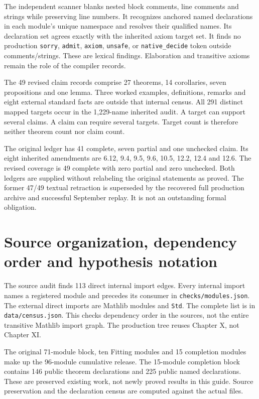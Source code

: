 \documentclass[11pt]{article}
\newcommand{\code}[1]{\nolinkurl{#1}}
\begin{document}
The independent scanner blanks nested block comments, line comments and strings while preserving line numbers. It recognizes anchored named declarations in each module's unique namespace and resolves their qualified names. Its declaration set agrees exactly with the inherited axiom target set. It finds no production \code{sorry}, \code{admit}, \code{axiom}, \code{unsafe}, or \code{native_decide} token outside comments/strings. These are lexical findings. Elaboration and transitive axioms remain the role of the compiler records.

The 49 revised claim records comprise 27 theorems, 14 corollaries, seven propositions and one lemma. Three worked examples, definitions, remarks and eight external standard facts are outside that internal census. All 291 distinct mapped targets occur in the 1,229-name inherited audit. A target can support several claims. A claim can require several targets. Target count is therefore neither theorem count nor claim count.

The original ledger has 41 complete, seven partial and one unchecked claim. Its eight inherited amendments are 6.12, 9.4, 9.5, 9.6, 10.5, 12.2, 12.4 and 12.6. The revised coverage is 49 complete with zero partial and zero unchecked. Both ledgers are supplied without relabeling the original statements as proved. The former 47/49 textual retraction is superseded by the recovered full production archive and successful September replay. It is not an outstanding formal obligation.

\section{Source organization, dependency order and hypothesis notation}
The source audit finds 113 direct internal import edges. Every internal import names a registered module and precedes its consumer in \code{checks/modules.json}. The external direct imports are Mathlib modules and \code{Std}. The complete list is in \code{data/census.json}. This checks dependency order in the sources, not the entire transitive Mathlib import graph. The production tree reuses Chapter X, not Chapter XI.

The original 71-module block, ten Fitting modules and 15 completion modules make up the 96-module cumulative release. The 15-module completion block contains 146 public theorem declarations and 225 public named declarations. These are preserved existing work, not newly proved results in this guide. Source preservation and the declaration census are computed against the actual files.
\end{document}
